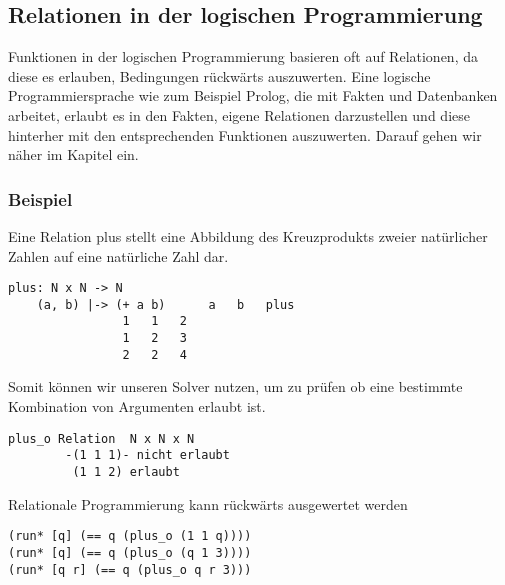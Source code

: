 \subsection{Relationen in der logischen Programmierung}

Funktionen in der logischen Programmierung basieren oft auf Relationen, da diese es erlauben, Bedingungen rückwärts auszuwerten. Eine logische Programmiersprache wie zum Beispiel Prolog, die mit Fakten und Datenbanken arbeitet, erlaubt es in den Fakten, eigene Relationen darzustellen und diese hinterher mit den entsprechenden Funktionen auszuwerten. Darauf gehen wir näher im Kapitel \emph{} ein.

\subsubsection{Beispiel}

Eine Relation plus stellt eine Abbildung des Kreuzprodukts zweier natürlicher Zahlen auf eine natürliche Zahl dar.

\begin{lstlisting}
plus: N x N -> N
    (a, b) |-> (+ a b)		a   b   plus
				1   1   2
				1   2   3
				2   2   4
\end{lstlisting}

Somit können wir unseren Solver nutzen, um zu prüfen ob eine bestimmte Kombination von Argumenten erlaubt ist.
\begin{lstlisting}
plus_o Relation	 N x N x N
		-(1 1 1)- nicht erlaubt
		 (1 1 2) erlaubt
\end{lstlisting}

Relationale Programmierung kann rückwärts ausgewertet werden

\begin{lstlisting}
(run* [q] (== q (plus_o (1 1 q))))
(run* [q] (== q (plus_o (q 1 3))))
(run* [q r] (== q (plus_o q r 3)))
\end{lstlisting}
